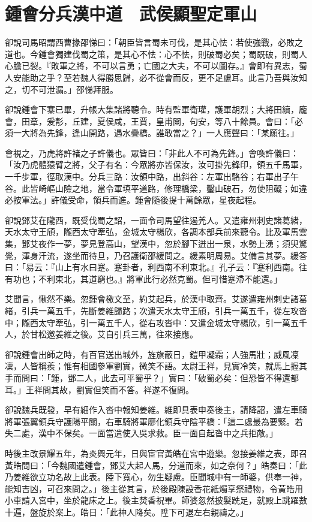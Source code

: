 
\chapter{鍾會分兵漢中道　武侯顯聖定軍山}

卻說司馬昭謂西曹掾邵悌曰：「朝臣皆言蜀未可伐，是其心怯：若使強戰，必敗之道也。今鍾會獨建伐蜀之策，是其心不怯：心不怯，則破蜀必矣；蜀既破，則蜀人心膽已裂。『敗軍之將，不可以言勇；亡國之大夫，不可以圖存。』會即有異志，蜀人安能助之乎？至若魏人得勝思歸，必不從會而反，更不足慮耳。此言乃吾與汝知之，切不可泄漏。」邵悌拜服。

卻說鍾會下寨已畢，升帳大集諸將聽令。時有監軍衛瓘，護軍胡烈；大將田續，龐會，田章，爰𩇕，丘建，夏侯咸，王賈，皇甫闓，句安，等八十餘員。會曰：「必須一大將為先鋒，逢山開路，遇水疊橋。誰敢當之？」一人應聲曰：「某願往。」

會視之，乃虎將許褚之子許儀也。眾皆曰：「非此人不可為先鋒。」會喚許儀曰：「汝乃虎體猿臂之將，父子有名：今眾將亦皆保汝，汝可掛先鋒印，領五千馬軍，一千步軍，徑取漢中。分兵三路：汝領中路，出斜谷：左軍出駱谷；右軍出子午谷。此皆崎嶇山險之地，當令軍填平道路，修理橋梁，鑿山破石，勿使阻礙；如違必按軍法。」許儀受命，領兵而進。鍾會隨後提十萬餘眾，星夜起程。

卻說鄧艾在隴西，既受伐蜀之詔，一面令司馬望往遏羌人。又遣雍州刺史諸葛緒，天水太守王頎，隴西太守牽弘，金城太守楊欣，各調本部兵前來聽令。比及軍馬雲集，鄧艾夜作一夢，夢見登高山，望漢中，忽於腳下迸出一泉，水勢上湧；須臾驚覺，渾身汗流，遂坐而待旦，乃召護衛邵緩問之。緩素明周易。艾備言其夢。緩答曰：「易云：『山上有水曰蹇。蹇卦者，利西南不利東北。』孔子云：『蹇利西南。往有功也；不利東北，其道窮也。』將軍此行必然克蜀。但可惜蹇滯不能還。」

艾聞言，愀然不樂。忽鍾會檄文至，約艾起兵，於漢中取齊。艾遂遣雍州刺史諸葛緒，引兵一萬五千，先斷姜維歸路；次遣天水太守王頎，引兵一萬五千，從左攻沓中；隴西太守牽弘，引一萬五千人，從右攻沓中：又遣金城太守楊欣，引一萬五千人，於甘松邀姜維之後。艾自引兵三萬，往來接應。

卻說鍾會出師之時，有百官送出城外，旌旗蔽日，鎧甲凝霜；人強馬壯；威風凜凜，人皆稱羨；惟有相國參軍劉實，微笑不語。太尉王祥，見實冷笑，就馬上握其手而問曰：「鍾，鄧二人，此去可平蜀乎？」實曰：「破蜀必矣：但恐皆不得還都耳。」王祥問其故，劉實但笑而不答。祥遂不復問。

卻說魏兵既發，早有細作入沓中報知姜維。維即具表申奏後主，請降詔，遣左車騎將軍張翼領兵守護陽平關，右車騎將軍廖化領兵守陰平橋：「這二處最為要緊。若失二處，漢中不保矣。一面當遣使入吳求救。臣一面自起沓中之兵拒敵。」

時後主改景耀五年，為炎興元年，日與宦官黃皓在宮中遊樂。忽接姜維之表，即召黃皓問曰：「今魏國遣鍾會，鄧艾大起人馬，分道而來，如之奈何？」皓奏曰：「此乃姜維欲立功名故上此表。陸下寬心，勿生疑慮。臣聞城中有一師婆，供奉一神，能知吉凶，可召來問之。」後主從其言，於後殿陳設香花紙燭享祭禮物，令黃皓用小車請入宮中，坐於龍床之上。後主焚香祝畢。師婆忽然披髮跣足，就殿上跳躍數十遍，盤旋於案上。皓日：「此神人降矣。陞下可退左右親禱之。」

